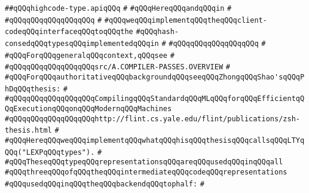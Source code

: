 \label{src/lib/compiler/back/top/highcode/highcode-type.api}
\verb|##qQQqhighcode-type.apiqQQq|\newline
\verb|#|\newline
\verb|#qQQqHereqQQqandqQQqin|\newline
\verb|#|\newline
\verb|#qQQqqQQqqQQqqQQqqQQq|\newline
\verb|#|\newline
\verb|#qQQqweqQQqimplementqQQqtheqQQqclient-codeqQQqinterfaceqQQqtoqQQqthe|\newline
\verb|#qQQqhash-consedqQQqtypesqQQqimplementedqQQqin|\newline
\verb|#|\newline
\verb|#qQQqqQQqqQQqqQQqqQQq|\newline
\verb|#|\newline
\verb|#qQQqForqQQqgeneralqQQqcontext,qQQqsee|\newline
\verb|#|\newline
\verb|#qQQqqQQqqQQqqQQqqQQqsrc/A.COMPILER-PASSES.OVERVIEW|\newline
\verb|#|\newline
\verb|#qQQqForqQQqauthoritativeqQQqbackgroundqQQqseeqQQqZhongqQQqShao'sqQQqPhDqQQqthesis:|\newline
\verb|#|\newline
\verb|#qQQqqQQqqQQqqQQqqQQqCompilingqQQqStandardqQQqMLqQQqforqQQqEfficientqQQqExecutionqQQqonqQQqModernqQQqMachines|\newline
\verb|#qQQqqQQqqQQqqQQqqQQqhttp://flint.cs.yale.edu/flint/publications/zsh-thesis.html|\newline
\verb|#|\newline
\verb|#qQQqHereqQQqweqQQqimplementqQQqwhatqQQqhisqQQqthesisqQQqcallsqQQqLTYqQQq("LEXPqQQqtypes").|\newline
\verb|#|\newline
\verb|#qQQqTheseqQQqtypeqQQqrepresentationsqQQqareqQQqusedqQQqinqQQqall|\newline
\verb|#qQQqthreeqQQqofqQQqtheqQQqintermediateqQQqcodeqQQqrepresentations|\newline
\verb|#qQQqusedqQQqinqQQqtheqQQqbackendqQQqtophalf:|\newline
\verb|#|\newline
